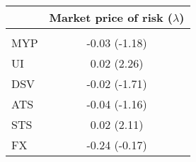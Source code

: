 \begin{table}
\centering
\begin{tabular}{l*{1}{c}}
\hline
& Market price of risk ($\lambda$)\\
\hline
\\
MYP & -0.03 (-1.18)\\
UI & 0.02 (2.26)\\
DSV & -0.02 (-1.71)\\
ATS & -0.04 (-1.16)\\
STS & 0.02 (2.11)\\
FX & -0.24 (-0.17)\\
\hline
\end{tabular}
\end{table}
